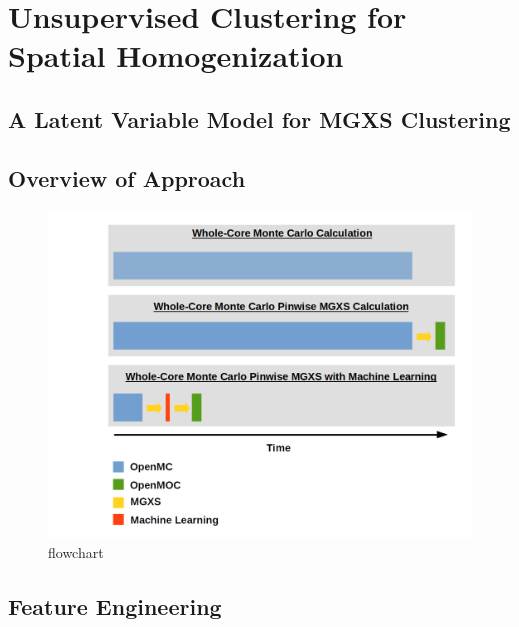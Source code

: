 \chapter{Unsupervised Clustering for Spatial Homogenization}
\label{chap:unsupervised}


\section{A Latent Variable Model for MGXS Clustering}
\label{sec:chap6-latent-model}


\section{Overview of Approach}
\label{sec:chap6-overview}

\begin{figure}
  \centering
  \includegraphics[width=\linewidth]{figures/pipeline/flow-chart}
  \caption{}
\caption[flowchar]{flowchart}
\label{fig:chap6-flow-chart}
\end{figure}



\section{Feature Engineering}
\label{sec:chap6-feature-engineer}

